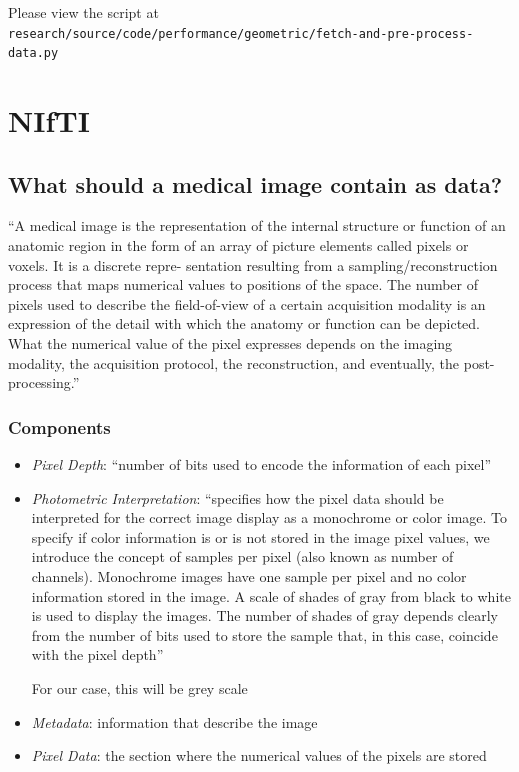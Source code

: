 \documentclass[11pt]{article}
\begin{document}
Please view the script at \texttt{research/source/code/performance/geometric/fetch-and-pre-process-data.py}

\section{NIfTI}

\subsection{What should a medical image contain as data?}

``A medical image is the representation of the internal structure
or function of an anatomic region in the form of an array of
picture elements called pixels or voxels. It is a discrete repre-
sentation resulting from a sampling/reconstruction process
that maps numerical values to positions of the space. The
number of pixels used to describe the field-of-view of a certain
acquisition modality is an expression of the detail with which
the anatomy or function can be depicted. What the numerical
value of the pixel expresses depends on the imaging modality,
the acquisition protocol, the reconstruction, and eventually,
the post-processing.'' \cite{file-formats}

\subsubsection{Components}

\begin{itemize}
    \item \textit{Pixel Depth}: ``number of bits used to encode the information of each pixel'' \cite{file-formats}
    \item \textit{Photometric Interpretation}:  ``specifies how the pixel data
    should be interpreted for the correct image display as a 
    monochrome or color image. To specify if color information is or is
    not stored in the image pixel values, we introduce the concept
    of samples per pixel (also known as number of channels).
    Monochrome images have one sample per pixel and no color
    information stored in the image. A scale of shades of gray
    from black to white is used to display the images. The number
    of shades of gray depends clearly from the number of bits used
    to store the sample that, in this case, coincide with the pixel
    depth'' \cite{file-formats}

    For our case, this will be grey scale 

    \item \textit{Metadata}: information that describe the image
    \item \textit{Pixel Data}: the section where the numerical values of the pixels are stored
\end{itemize}
\end{document}
